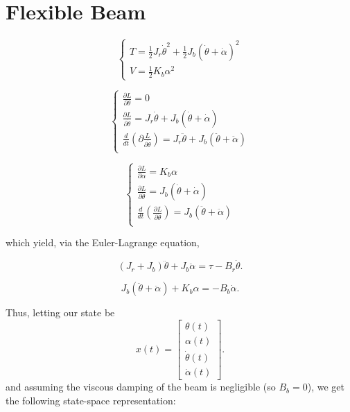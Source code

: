 \section{Flexible Beam}
\begin{equation*}
    \begin{cases}
        T = \frac{1}{2}J_r \dot{\theta}^2 + \frac{1}{2} J_b \left(\dot{\theta}+\dot{\alpha}\right)^2 \\
        V = \frac{1}{2} K_b \alpha^2
    \end{cases}
\end{equation*}

\[
    \begin{cases}
        \frac{\partial L}{\partial \theta}=0                                                                                             \\
        \frac{\partial L}{\partial \dot{\theta}}=J_r\dot{\theta}+J_b\left(\dot{\theta}+\dot{\alpha}\right)                               \\
        \frac{d}{dt} \left(\partial \frac{L}{\partial \dot{\theta}}\right)= J_r\ddot{\theta}+J_b\left(\ddot{\theta}+\ddot{\alpha}\right) \\
    \end{cases}
\]

\[
    \begin{cases}
        \frac{\partial L}{\partial \alpha}=K_b\alpha                                                                    \\
        \frac{\partial L}{\partial \dot{\theta}}=J_b\left(\dot{\theta}+\dot{\alpha}\right)                              \\
        \frac{d}{dt} \left(\frac{\partial L}{\partial \dot{\theta}}\right)= J_b\left(\ddot{\theta}+\ddot{\alpha}\right) \\
    \end{cases}
\]

which yield, via the Euler-Lagrange equation,

\[
    \left(J_r + J_b\right)\ddot{\theta} + J_b \ddot{\alpha} = \tau - B_r \dot{\theta}.
\]

\[
    J_b \left(\ddot{\theta} + \ddot{\alpha}\right) + K_b \alpha = -B_b \dot{\alpha}.
\]

Thus, letting our state be
\[
    x(t) =
    \left[\begin{array}{c}
            \theta(t)       \\
            \alpha(t)       \\
            \dot{\theta}(t) \\
            \dot{\alpha}(t)
        \end{array}\right].
\]
and assuming the viscous damping of the beam is negligible (so $B_b = 0$), we get the following state-space representation:

